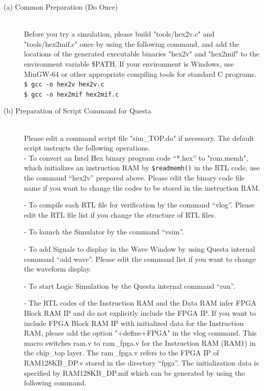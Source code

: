 \begin{description}

    \item[(a) Common Preparation (Do Once)]\mbox{}\\
Before you try a simulation, please build "tools/hex2v.c" and "tools/hex2mif.c" once by using the following command, and add the locations of the generated executable binaries "hex2v" and "hex2mif" to the environment variable \$PATH. If your environment is Windows, use MinGW-64 or other appropriate compiling tools for standard C programs.\\

\texttt{\$ gcc -o hex2v hex2v.c}\\
\texttt{\$ gcc -o hex2mif hex2mif.c}\\

    \item[(b) Preparation of Script Command for Questa]\mbox{} \\
Please edit a command script file "sim\_TOP.do" if necessary. The default script instructs the following operations.\\

- To convert an Intel Hex binary program code “*.hex” to "rom.memh", which initializes an instruction RAM by \texttt{\$readmemh()} in the RTL code, use the command “hex2v” prepared above. Please edit the binary code file name if you want to change the codes to be stored in the instruction RAM.

- To compile each RTL file for verification by the command “vlog”. Please edit the RTL file list if you change the structure of RTL files.

- To launch the Simulator by the command “vsim”.

- To add Signals to display in the Wave Window by using Questa internal command “add wave”. Please edit the command list if you want to change the waveform display.

- To start Logic Simulation by the Questa internal command “run”.

- The RTL codes of the Instruction RAM and the Data RAM infer FPGA Block RAM IP and do not explicitly include the FPGA IP. If you want to include FPGA Block RAM IP with initialized data for the Instruction RAM, please add the option "+define+FPGA" in the vlog command. This macro switches ram.v to ram\_fpga.v for the Instruction RAM (RAM1) in the chip\_top layer. The ram\_fpga.v refers to the FPGA IP of RAM128KB\_DP.v stored in the directory “fpga”. The initialization data is specified by RAM128KB\_DP.mif which can be generated by using the following command.\\


\end{description}
